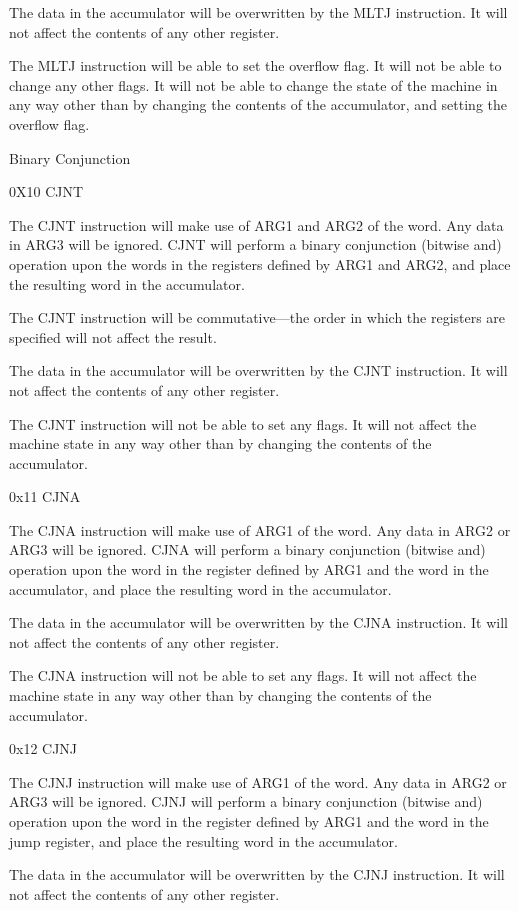 \documentclass[]{article}
\begin{document}
The data in the accumulator will be overwritten by the MLTJ instruction.
It will not affect the contents of any other register.

The MLTJ instruction will be able to set the overflow flag. It will not
be able to change any other flags. It will not be able to change the
state of the machine in any way other than by changing the contents of
the accumulator, and setting the overflow flag.

Binary Conjunction

0X10 CJNT

The CJNT instruction will make use of ARG1 and ARG2 of the word. Any
data in ARG3 will be ignored. CJNT will perform a binary conjunction
(bitwise and) operation upon the words in the registers defined by ARG1
and ARG2, and place the resulting word in the accumulator.

The CJNT instruction will be commutative---the order in which the
registers are specified will not affect the result.

The data in the accumulator will be overwritten by the CJNT instruction.
It will not affect the contents of any other register.

The CJNT instruction will not be able to set any flags. It will not
affect the machine state in any way other than by changing the contents
of the accumulator.

0x11 CJNA

The CJNA instruction will make use of ARG1 of the word. Any data in ARG2
or ARG3 will be ignored. CJNA will perform a binary conjunction (bitwise
and) operation upon the word in the register defined by ARG1 and the
word in the accumulator, and place the resulting word in the
accumulator.

The data in the accumulator will be overwritten by the CJNA instruction.
It will not affect the contents of any other register.

The CJNA instruction will not be able to set any flags. It will not
affect the machine state in any way other than by changing the contents
of the accumulator.

0x12 CJNJ

The CJNJ instruction will make use of ARG1 of the word. Any data in ARG2
or ARG3 will be ignored. CJNJ will perform a binary conjunction (bitwise
and) operation upon the word in the register defined by ARG1 and the
word in the jump register, and place the resulting word in the
accumulator.

The data in the accumulator will be overwritten by the CJNJ instruction.
It will not affect the contents of any other register.
\end{document}
